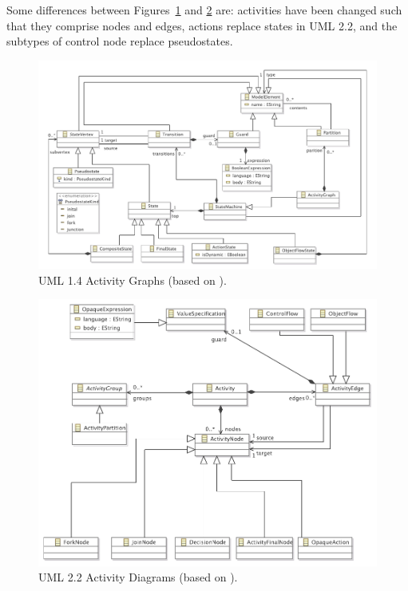 Some differences between Figures~\ref{fig:uml14} and \ref{fig:uml22} are: activities have been changed such that they comprise nodes and edges, actions replace states in UML 2.2, and the subtypes of control node replace pseudostates.

\begin{figure}[htbp]
  \centering
\includegraphics[width=12cm]{A.3.MigrationStrategies/images/uml/activity_diagrams_before.pdf}
  \caption[UML 1.4 Activity Graphs]{UML 1.4 Activity Graphs (based on \cite{uml14}).}
  \label{fig:uml14}
\end{figure} 

\begin{figure}[htbp]
  \centering
\includegraphics[width=12cm]{A.3.MigrationStrategies/images/uml/activity_diagrams_after.pdf}
  \caption[UML 2.2 Activity Diagrams]{UML 2.2 Activity Diagrams (based on \cite{uml22}).}
  \label{fig:uml22}
\end{figure}


